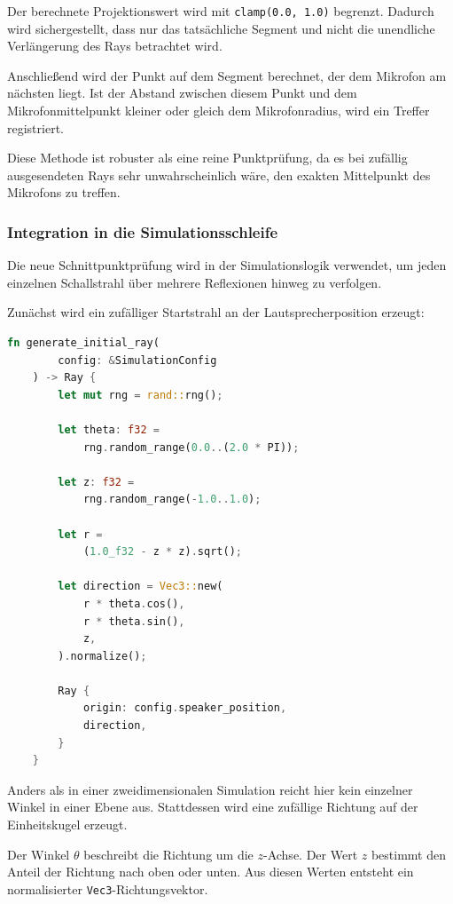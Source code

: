 \documentclass{article}
\begin{document}
    Der berechnete Projektionswert wird mit
    \texttt{clamp(0.0, 1.0)} begrenzt. Dadurch wird sichergestellt, dass nur das
    tatsächliche Segment und nicht die unendliche Verlängerung des Rays betrachtet
    wird.

    Anschließend wird der Punkt auf dem Segment berechnet, der dem Mikrofon am
    nächsten liegt. Ist der Abstand zwischen diesem Punkt und dem
    Mikrofonmittelpunkt kleiner oder gleich dem Mikrofonradius, wird ein Treffer
    registriert.

    Diese Methode ist robuster als eine reine Punktprüfung, da es bei zufällig
    ausgesendeten Rays sehr unwahrscheinlich wäre, den exakten Mittelpunkt des
    Mikrofons zu treffen.


    \subsubsection{Integration in die Simulationsschleife}
    \label{subsubsec:simulation-loop}

    Die neue Schnittpunktprüfung wird in der Simulationslogik verwendet, um jeden
    einzelnen Schallstrahl über mehrere Reflexionen hinweg zu verfolgen.

    Zunächst wird ein zufälliger Startstrahl an der Lautsprecherposition erzeugt:

    \begin{lstlisting}[language=Rust]
    fn generate_initial_ray(
        config: &SimulationConfig
    ) -> Ray {
        let mut rng = rand::rng();

        let theta: f32 =
            rng.random_range(0.0..(2.0 * PI));

        let z: f32 =
            rng.random_range(-1.0..1.0);

        let r =
            (1.0_f32 - z * z).sqrt();

        let direction = Vec3::new(
            r * theta.cos(),
            r * theta.sin(),
            z,
        ).normalize();

        Ray {
            origin: config.speaker_position,
            direction,
        }
    }
    \end{lstlisting}

    Anders als in einer zweidimensionalen Simulation reicht hier kein einzelner
    Winkel in einer Ebene aus. Stattdessen wird eine zufällige Richtung auf der
    Einheitskugel erzeugt.

    Der Winkel \(\theta\) beschreibt die Richtung um die \(z\)-Achse. Der Wert
    \(z\) bestimmt den Anteil der Richtung nach oben oder unten. Aus diesen
    Werten entsteht ein normalisierter \texttt{Vec3}-Richtungsvektor.
\end{document}
